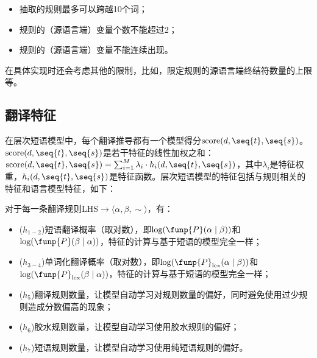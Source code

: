 \begin{itemize}
\vspace{0.5em}
\item 抽取的规则最多可以跨越10个词；
\vspace{0.5em}
\item 规则的（源语言端）变量个数不能超过2；
\vspace{0.5em}
\item 规则的（源语言端）变量不能连续出现。
\vspace{0.5em}
\end{itemize}
\parinterval 在具体实现时还会考虑其他的限制，比如，限定规则的源语言端终结符数量的上限等。


\subsection{翻译特征}

\parinterval 在层次短语模型中，每个翻译推导都有一个模型得分$\textrm{score}(d,\seq{t},\seq{s})$。$\textrm{score}(d,\seq{t},\seq{s})$是若干特征的线性加权之和：$\textrm{score}(d,\seq{t},\seq{s})=\sum_{i=1}^M\lambda_i\cdot h_i (d,\seq{t},\seq{s})$，其中$\lambda_i$是特征权重，$h_i (d,\seq{t},\seq{s})$是特征函数。层次短语模型的特征包括与规则相关的特征和语言模型特征，如下：

\parinterval 对于每一条翻译规则LHS$\to \langle \alpha, \beta ,\sim \rangle$，有：

\begin{itemize}
\vspace{0.5em}
\item 	($h_{1-2}$)短语翻译概率（取对数），即$\textrm{log}(\funp{P}(\alpha \mid \beta))$和$\textrm{log}(\funp{P}(\beta \mid \alpha))$，特征的计算与基于短语的模型完全一样；
\vspace{0.5em}
\item 	($h_{3-4}$)单词化翻译概率（取对数），即$\textrm{log}(\funp{P}_{\textrm{lex}}(\alpha \mid \beta))$和$\textrm{log}(\funp{P}_{\textrm{lex}}(\beta \mid \alpha))$，特征的计算与基于短语的模型完全一样；
\vspace{0.5em}
\item ($h_{5}$)翻译规则数量，让模型自动学习对规则数量的偏好，同时避免使用过少规则造成分数偏高的现象；
\vspace{0.5em}
\item ($h_{6}$)胶水规则数量，让模型自动学习使用胶水规则的偏好；
\vspace{0.5em}
\item ($h_{7}$)短语规则数量，让模型自动学习使用纯短语规则的偏好。
\vspace{0.5em}
\end{itemize}

